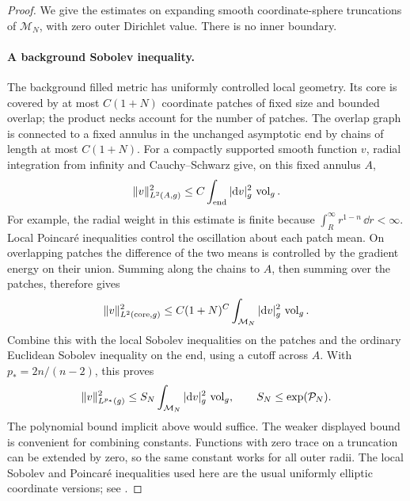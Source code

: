 \begin{proof}
We give the estimates on expanding smooth coordinate-sphere truncations of
$\mathcal M_N$, with zero outer Dirichlet value.  There is no inner boundary.

\paragraph{A background Sobolev inequality.}
The background filled metric has uniformly controlled local geometry.  Its
core is covered by at most $C(1+N)$ coordinate patches of fixed size and
bounded overlap; the product necks account for the number of patches.
The overlap graph is connected to a fixed annulus in the unchanged
asymptotic end by chains of length at most $C(1+N)$.  For a compactly
supported smooth function $v$, radial integration from infinity and
Cauchy--Schwarz give, on this fixed annulus $A$,
\begin{equation}
 \|v\|_{L^2(A,g)}^2\leq
 C\int_{\mathrm{end}}|\mathrm d v|_g^2\,\operatorname{vol}_g.
 \label{flux:anchor-annulus}
\end{equation}
For example, the radial weight in this estimate is finite because
$\int_R^\infty r^{1-n}\,\dd r<\infty$.  Local Poincar\'e inequalities
control the oscillation about each patch mean.  On overlapping patches the
difference of the two means is controlled by the gradient energy on their
union.  Summing along the chains to $A$, then summing over the patches,
therefore gives
\begin{equation}
 \|v\|_{L^2(\mathrm{core},g)}^2
 \leq C(1+N)^C\int_{\mathcal M_N}|\mathrm d v|_g^2\,\operatorname{vol}_g.
 \label{flux:core-poincare}
\end{equation}
Combine this with the local Sobolev inequalities on the patches and the
ordinary Euclidean Sobolev inequality on the end, using a cutoff across
$A$.  With $p_*=2n/(n-2)$, this proves
\begin{equation}
 \|v\|_{L^{p_*}(g)}^2\leq
 S_N\int_{\mathcal M_N}|\mathrm d v|_g^2\,\operatorname{vol}_g,
 \qquad S_N\leq\exp(\mathcal P_N).
 \label{flux:background-Sobolev}
\end{equation}
The polynomial bound implicit above would suffice.  The weaker displayed
bound is convenient for combining constants.  Functions with zero trace
on a truncation can be extended by zero, so the same constant works for
all outer radii.  The local Sobolev and Poincar\'e inequalities used here are
the usual uniformly elliptic coordinate versions; see
\cite[Chapters 7--8]{GilbargTrudinger2001}.


\end{proof}
